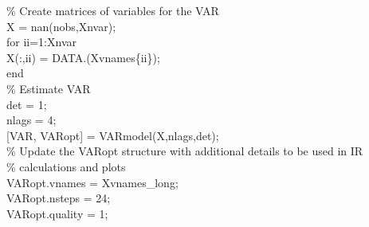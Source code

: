 \hspace{1mm}\textcolor{matlabgreen}{\% Create matrices of variables \textcolor{matlabblue}{for} the VAR }\\ 
\hspace{1mm}\hspace{5mm} X = nan(nobs,Xnvar); \\ 
\hspace{1mm}\hspace{5mm} \textcolor{matlabblue}{for} ii=1:Xnvar \\ 
\hspace{1mm}\hspace{5mm} \hspace{5mm} X(:,ii) = DATA.(Xvnames\{ii\}); \\ 
\hspace{1mm}\hspace{5mm} \textcolor{matlabblue}{end} \\ 
\hspace{1mm}\hspace{5mm} \textcolor{matlabgreen}{\% Estimate VAR }\\ 
\hspace{1mm}\hspace{5mm} det = 1; \\ 
\hspace{1mm}\hspace{5mm} nlags = 4; \\ 
\hspace{1mm}\hspace{5mm} [VAR, VARopt] = VARmodel(X,nlags,det); \\ 
\hspace{1mm}\hspace{5mm} \textcolor{matlabgreen}{\% Update the VARopt structure with additional details to be used in IR  }\\ 
\hspace{1mm}\hspace{5mm} \textcolor{matlabgreen}{\% calculations and plots }\\ 
\hspace{1mm}\hspace{5mm} VARopt.vnames = Xvnames\_long; \\ 
\hspace{1mm}\hspace{5mm} VARopt.nsteps = 24; \\ 
\hspace{1mm}\hspace{5mm} VARopt.quality = 1; \\ 
